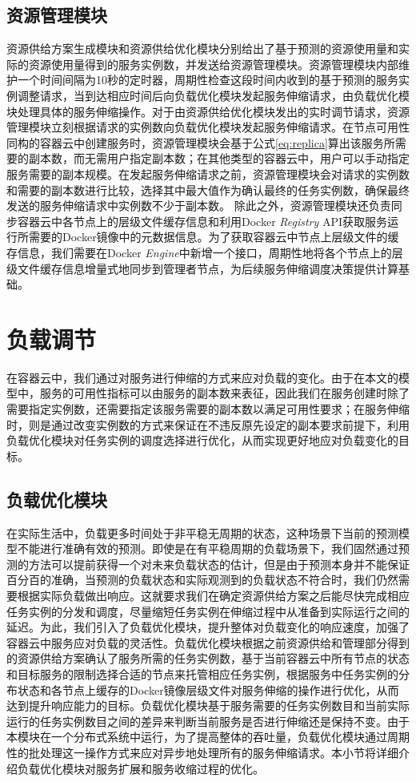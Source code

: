 \subsection{资源管理模块}\label{sec:provision_utils}
资源供给方案生成模块和资源供给优化模块分别给出了基于预测的资源使用量和实际的资源使用量得到的服务实例数，并发送给资源管理模块。资源管理模块内部维护一个时间间隔为10秒的定时器，周期性检查这段时间内收到的基于预测的服务实例调整请求，当到达相应时间后向负载优化模块发起服务伸缩请求，由负载优化模块处理具体的服务伸缩操作。对于由资源供给优化模块发出的实时调节请求，资源管理模块立刻根据请求的实例数向负载优化模块发起服务伸缩请求。在节点可用性同构的容器云中创建服务时，资源管理模块会基于公式\ref{eq:replica}算出该服务所需要的副本数，而无需用户指定副本数；在其他类型的容器云中，用户可以手动指定服务需要的副本规模。在发起服务伸缩请求之前，资源管理模块会对请求的实例数和需要的副本数进行比较，选择其中最大值作为确认最终的任务实例数，确保最终发送的服务伸缩请求中实例数不少于副本数。
除此之外，资源管理模块还负责同步容器云中各节点上的层级文件缓存信息和利用Docker \emph{Registry} API获取服务运行所需要的Docker镜像中的元数据信息。为了获取容器云中节点上层级文件的缓存信息，我们需要在Docker \emph{Engine}中新增一个接口，周期性地将各个节点上的层级文件缓存信息增量式地同步到管理者节点，为后续服务伸缩调度决策提供计算基础。

\section{负载调节}
在容器云中，我们通过对服务进行伸缩的方式来应对负载的变化。由于在本文的模型中，服务的可用性指标可以由服务的副本数来表征，因此我们在服务创建时除了需要指定实例数，还需要指定该服务需要的副本数以满足可用性要求；在服务伸缩时，则是通过改变实例数的方式来保证在不违反原先设定的副本要求前提下，利用负载优化模块对任务实例的调度选择进行优化，从而实现更好地应对负载变化的目标。

\subsection{负载优化模块}\label{sec:scheduler}
在实际生活中，负载更多时间处于非平稳无周期的状态，这种场景下当前的预测模型不能进行准确有效的预测。即使是在有平稳周期的负载场景下，我们固然通过预测的方法可以提前获得一个对未来负载状态的估计，但是由于预测本身并不能保证百分百的准确，当预测的负载状态和实际观测到的负载状态不符合时，我们仍然需要根据实际负载做出响应。这就要求我们在确定资源供给方案之后能尽快完成相应任务实例的分发和调度，尽量缩短任务实例在伸缩过程中从准备到实际运行之间的延迟。为此，我们引入了负载优化模块，提升整体对负载变化的响应速度，加强了容器云中服务应对负载的灵活性。负载优化模块根据之前资源供给和管理部分得到的资源供给方案确认了服务所需的任务实例数，基于当前容器云中所有节点的状态和目标服务的限制选择合适的节点来托管相应任务实例，根据服务中任务实例的分布状态和各节点上缓存的Docker镜像层级文件对服务伸缩的操作进行优化，从而达到提升响应能力的目标。负载优化模块基于服务需要的任务实例数目和当前实际运行的任务实例数目之间的差异来判断当前服务是否进行伸缩还是保持不变。由于本模块在一个分布式系统中运行，为了提高整体的吞吐量，负载优化模块通过周期性的批处理这一操作方式来应对异步地处理所有的服务伸缩请求。本小节将详细介绍负载优化模块对服务扩展和服务收缩过程的优化。

